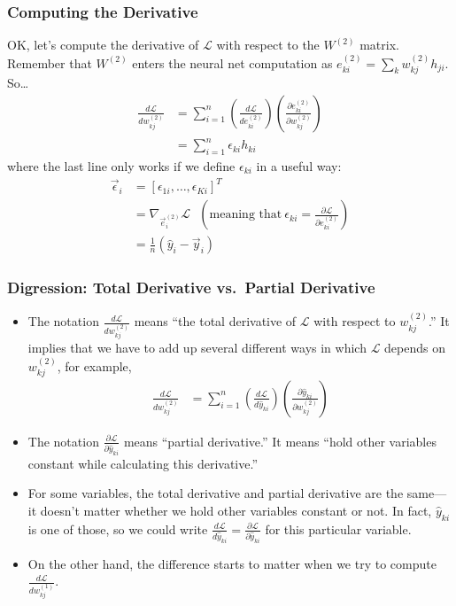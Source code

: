 \documentclass{beamer}
\begin{document}
\begin{frame}
  \frametitle{Computing the Derivative}
  OK, let's compute the derivative of ${\mathcal L}$ with respect to the $W^{(2)}$
  matrix.  Remember that $W^{(2)}$ enters the neural net computation as
  $e_{ki}^{(2)}=\sum_k w_{kj}^{(2)}h_{ji}$.  So\ldots
  \begin{align*}
    \frac{d{\mathcal L}}{dw_{kj}^{(2)}} &=
    \sum_{i=1}^n
    \left(\frac{d{\mathcal L}}{de_{ki}^{(2)}}\right)
    \left(\frac{\partial e_{ki}^{(2)}}{\partial w_{kj}^{(2)}}\right)\\
    &= \sum_{i=1}^n \epsilon_{ki}h_{ki}
  \end{align*}
  where the last line only works if we define $\epsilon_{ki}$ in
  a useful way:
  \begin{align*}
    \vec\epsilon_i &= [\epsilon_{1i},\ldots,\epsilon_{Ki}]^T \\
    &= \nabla_{\vec{e}_{i}^{(2)}}{\mathcal L}~~~
    \left(\mbox{meaning that}~\epsilon_{ki}=\frac{\partial{\mathcal L}}{\partial e_{ki}^{(2)}}\right)\\
    &= \frac{1}{n}(\hat{y}_{i}-\vec{y}_{i})
  \end{align*}
\end{frame}

\begin{frame}
  \frametitle{Digression: Total Derivative vs.~Partial Derivative}
  \begin{itemize}
  \item The notation $\frac{d{\mathcal L}}{dw_{kj}^{(2)}}$ means
    ``the total derivative of ${\mathcal L}$ with respect to
    $w_{kj}^{(2)}$.'' It implies that we have to add up several
    different ways in which ${\mathcal L}$ depends on
    $w_{kj}^{(2)}$, for example,
    \begin{align*}
      \frac{d{\mathcal L}}{dw_{kj}^{(2)}} &=
      \sum_{i=1}^n
      \left(\frac{d{\mathcal L}}{d\hat{y}_{ki}}\right)
      \left(\frac{\partial\hat{y}_{ki}}{\partial w_{kj}^{(2)}}\right)
    \end{align*}
  \item The notation $\frac{\partial{\mathcal
      L}}{\partial\hat{y}_{ki}}$ means ``partial derivative.''  It
    means ``hold other variables constant while calculating this
    derivative.''
  \item For some variables, the total derivative and partial
    derivative are the same---it doesn't matter whether we hold other
    variables constant or not.  In fact, $\hat{y}_{ki}$ is one of
    those, so we could write $\frac{d{\mathcal
        L}}{d\hat{y}_{ki}}=\frac{\partial{\mathcal
        L}}{\partial\hat{y}_{ki}}$ for this particular variable.
  \item On the other hand, the difference starts to matter when we try
    to compute $\frac{d{\mathcal L}}{d w_{kj}^{(1)}}$.
  \end{itemize}
\end{frame}
\end{document}
